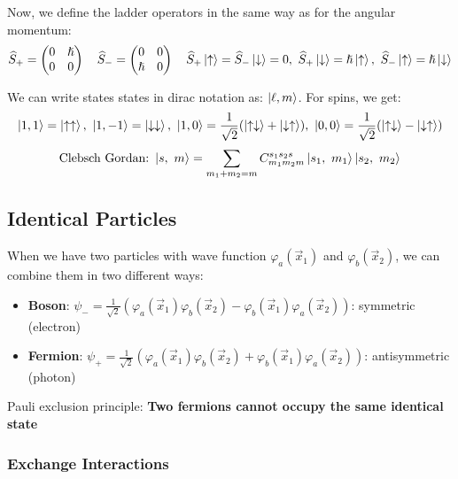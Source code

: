 \documentclass[a4paper, 9pt]{extarticle}
\begin{document}
Now, we define the ladder operators in the same way as for the angular momentum:
$$\widehat{S}_+ = \begin{pmatrix} 0&\hslash\\0&0 \end{pmatrix} \quad \widehat{S}_- = \begin{pmatrix} 0&0\\\hslash&0 \end{pmatrix} \quad \widehat{S}_+ \ket{\uparrow} = \widehat{S}_- \ket{\downarrow} = 0, \ \widehat{S}_+ \ket{\downarrow} = \hslash \ket{\uparrow}, \ \widehat{S}_- \ket{\uparrow} = \hslash \ket{\downarrow}$$

We can write states states in dirac notation as: $\ket{\ell,m}$. For spins, we get:
$$\ket{1,1} = \ket{\uparrow \uparrow}, \ \ket{1,-1} = \ket{\downarrow \downarrow}, \ \ket{1,0} = \frac{1}{\sqrt2}(\ket{\uparrow \downarrow} + \ket{\downarrow \uparrow}), \ \ket{0,0} = \frac{1}{\sqrt2} (\ket{\uparrow \downarrow} - \ket{\downarrow \uparrow}) $$
$$\text{Clebsch Gordan:} \ \Ket{s,\ m} = \sum_{m_1 + m_2 = m} C_{m_1 m_2 m}^{s_1 s_2 s} \Ket{s_1, \ m_1} \Ket{s_2, \ m_2}$$

\subsection{Identical Particles}
When we have two particles with wave function $\varphi_a(\vec x_1)$ and $\varphi_b(\vec x_2)$, we can combine them in two different ways:
\begin{itemize}
	\item \textbf{Boson}: $\psi_- = \frac{1}{\sqrt2} \left( \varphi_a (\vec x_1) \varphi_b(\vec x_2) - \varphi_b(\vec x_1) \varphi_a (\vec x_2) \right)$: symmetric (electron)
	\item \textbf{Fermion}: $\psi_+ = \frac{1}{\sqrt2} \left( \varphi_a (\vec x_1) \varphi_b(\vec x_2) + \varphi_b(\vec x_1) \varphi_a (\vec x_2) \right)$: antisymmetric (photon)
\end{itemize}
Pauli exclusion principle: \textbf{Two fermions cannot occupy the same identical state}

\subsubsection{Exchange Interactions}
\end{document}
